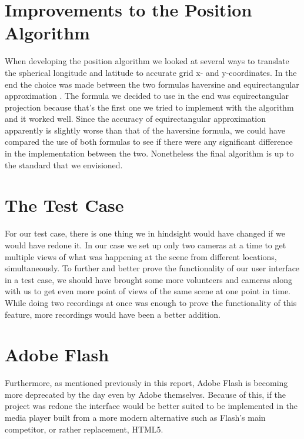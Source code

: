 \section{Improvements to the Position Algorithm}
\label{sec:posimp}

When developing the position algorithm we looked at several ways to translate the spherical longitude and latitude to accurate grid x- and y-coordinates. In the end the choice was made between the two formulas haversine and equirectangular approximation \cite{haversine,equi}. The formula we decided to use in the end was equirectangular projection because that’s the first one we tried to implement with the algorithm and it worked well. Since the accuracy of equirectangular approximation apparently is slightly worse than that of the haversine formula, we could have compared the use of both formulas to see if there were any significant difference in the implementation between the two. Nonetheless the final algorithm is up to the standard that we envisioned. 

\section{The Test Case}
\label{sec:test case}

For our test case, there is one thing we in hindsight would have changed if we would have redone it. In our case we set up only two cameras at a time to get multiple views of what was happening at the scene from different locations, simultaneously. To further and better prove the functionality of our user interface in a test case, we should have brought some more volunteers and cameras along with us to get even more point of views of the same scene at one point in time. While doing two recordings at once was enough to prove the functionality of this feature, more recordings would have been a better addition. 

\section{Adobe Flash}
\label{sec:adobe flash}

Furthermore, as mentioned previously in this report, Adobe Flash is becoming more deprecated by the day even by Adobe themselves. Because of this, if the project was redone the interface would be better suited to be implemented in the media player built from a more modern alternative such as Flash’s main competitor, or rather replacement, HTML5.

